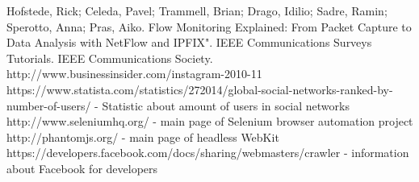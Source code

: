 \begin{thebibliography}{9}

Hofstede, Rick; Celeda, Pavel; Trammell, Brian; Drago, Idilio; Sadre, Ramin; Sperotto, Anna; Pras, Aiko. Flow Monitoring Explained: From Packet Capture to Data Analysis with NetFlow and IPFIX". IEEE Communications Surveys Tutorials. IEEE Communications Society.
http://www.businessinsider.com/instagram-2010-11
https://www.statista.com/statistics/272014/global-social-networks-ranked-by-number-of-users/ - Statistic about amount of users in social networks
http://www.seleniumhq.org/ - main page of Selenium browser automation project
http://phantomjs.org/ - main page of headless WebKit
https://developers.facebook.com/docs/sharing/webmasters/crawler - information about Facebook for developers

\end{thebibliography}
